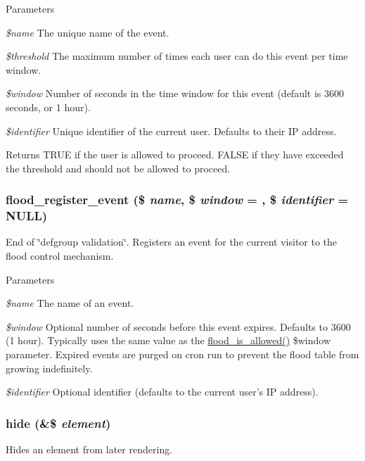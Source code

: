 \begin{DoxyParams}{Parameters}
\item[{\em \$name}]The unique name of the event. \item[{\em \$threshold}]The maximum number of times each user can do this event per time window. \item[{\em \$window}]Number of seconds in the time window for this event (default is 3600 seconds, or 1 hour). \item[{\em \$identifier}]Unique identifier of the current user. Defaults to their IP address.\end{DoxyParams}
\begin{DoxyReturn}{Returns}
TRUE if the user is allowed to proceed. FALSE if they have exceeded the threshold and should not be allowed to proceed. 
\end{DoxyReturn}
\hypertarget{common_8inc_adb073363e7ad9091fc5f378988e4d019}{
\subsubsection[{flood\_\-register\_\-event}]{\setlength{\rightskip}{0pt plus 5cm}flood\_\-register\_\-event (\$ {\em name}, \/  \$ {\em window} = {}, \/  \$ {\em identifier} = {\ttfamily NULL})}}
\label{common_8inc_adb073363e7ad9091fc5f378988e4d019}
End of \char`\"{}defgroup validation\char`\"{}. Registers an event for the current visitor to the flood control mechanism.


\begin{DoxyParams}{Parameters}
\item[{\em \$name}]The name of an event. \item[{\em \$window}]Optional number of seconds before this event expires. Defaults to 3600 (1 hour). Typically uses the same value as the \hyperlink{common_8inc_a4c6d4ab47d558e42ac08f5fbf90f2d6f}{flood\_\-is\_\-allowed()} \$window parameter. Expired events are purged on cron run to prevent the flood table from growing indefinitely. \item[{\em \$identifier}]Optional identifier (defaults to the current user's IP address). \end{DoxyParams}
\hypertarget{common_8inc_aa57f04b6e1f5cdc3ed30abf98fd0fd3f}{
\subsubsection[{hide}]{\setlength{\rightskip}{0pt plus 5cm}hide (\&\$ {\em element})}}
\label{common_8inc_aa57f04b6e1f5cdc3ed30abf98fd0fd3f}
Hides an element from later rendering.

